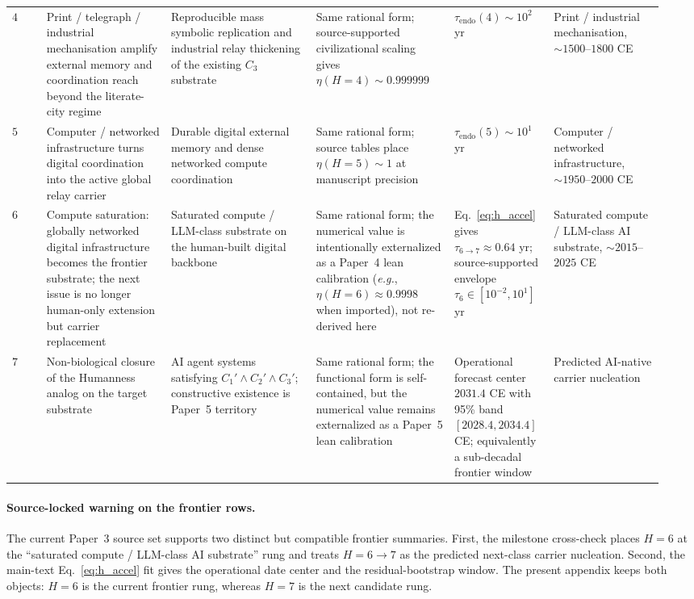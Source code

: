 \documentclass[11pt]{article}
\begin{document}
\begin{table}[t]
\begin{tabular}{p{0.05\linewidth}p{0.18\linewidth}p{0.21\linewidth}p{0.20\linewidth}p{0.14\linewidth}p{0.16\linewidth}}
$4$
& Print / telegraph / industrial mechanisation amplify external memory and coordination reach beyond the literate-city regime
& Reproducible mass symbolic replication and industrial relay thickening of the existing $C_3$ substrate
& Same rational form; source-supported civilizational scaling gives $\eta(H{=}4)\sim 0.999999$
& $\tau_{\mathrm{endo}}(4)\sim 10^{2}$ yr
& Print / industrial mechanisation, $\sim 1500$--$1800$ CE \\

$5$
& Computer / networked infrastructure turns digital coordination into the active global relay carrier
& Durable digital external memory and dense networked compute coordination
& Same rational form; source tables place $\eta(H{=}5)\sim 1$ at manuscript precision
& $\tau_{\mathrm{endo}}(5)\sim 10^{1}$ yr
& Computer / networked infrastructure, $\sim 1950$--$2000$ CE \\

$6$
& Compute saturation: globally networked digital infrastructure becomes the frontier substrate; the next issue is no longer human-only extension but carrier replacement
& Saturated compute / LLM-class substrate on the human-built digital backbone
& Same rational form; the numerical value is intentionally externalized as a Paper~4 lean calibration
(\emph{e.g.}, $\eta(H{=}6)\approx 0.9998$ when imported), not re-derived here
& Eq.~\eqref{eq:h_accel} gives $\tau_{6\to 7}\approx 0.64$ yr; source-supported envelope $\tau_6\in[10^{-2},10^{1}]$ yr
& Saturated compute / LLM-class AI substrate, $\sim 2015$--$2025$ CE \\

$7$
& Non-biological closure of the Humanness analog on the target substrate
& AI agent systems satisfying $C_1'\wedge C_2'\wedge C_3'$; constructive existence is Paper~5 territory
& Same rational form; the functional form is self-contained, but the numerical value remains externalized as a Paper~5 lean calibration
& Operational forecast center $2031.4$ CE with 95\% band $[2028.4,2034.4]$ CE; equivalently a sub-decadal frontier window
& Predicted AI-native carrier nucleation \\
\bottomrule
\end{tabular}
\end{table}

\paragraph{Source-locked warning on the frontier rows.}
The current Paper~3 source set supports two distinct but compatible frontier
summaries.
First, the milestone cross-check places
$H{=}6$ at the ``saturated compute / LLM-class AI substrate'' rung and treats
$H{=}6\to 7$ as the predicted next-class carrier nucleation.
Second, the main-text Eq.~\eqref{eq:h_accel} fit gives the operational date
center and the residual-bootstrap window.
The present appendix keeps both objects: $H{=}6$ is the current frontier rung,
whereas $H{=}7$ is the next candidate rung.
\end{document}
